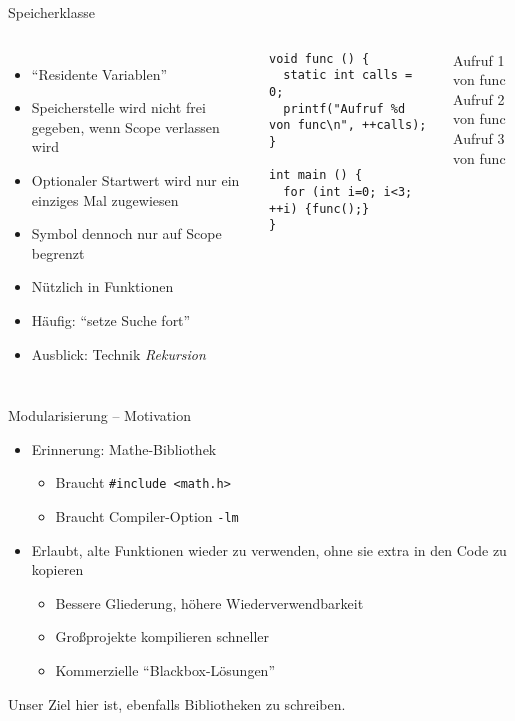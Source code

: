 \begin{frame}[fragile]{Speicherklasse }
%
\begin{columns}[T]
\begin{itemize}
\item \enquote{Residente Variablen}
\item Speicherstelle wird nicht frei gegeben, wenn Scope verlassen wird
\item Optionaler Startwert wird nur ein einziges Mal zugewiesen
\item Symbol dennoch nur auf Scope begrenzt
\item Nützlich in Funktionen
\item Häufig: \enquote{setze Suche fort}
\item Ausblick: Technik \emph{Rekursion}
\end{itemize}
%
\vspace{-10pt}
\begin{codebox}
\begin{verbatim}
void func () {
  static int calls = 0;
  printf("Aufruf %d von func\n", ++calls);
}

int main () {
  for (int i=0; i<3; ++i) {func();}
}
\end{verbatim}
\end{codebox}
%
\begin{cmdbox}[Ausgabe]
\scriptsize
Aufruf 1 von func\\
Aufruf 2 von func\\
Aufruf 3 von func
\end{cmdbox}
\end{columns}
%
\end{frame}


\begin{frame}[fragile]{Modularisierung -- Motivation}
%
\begin{itemize}
\item Erinnerung: Mathe-Bibliothek
	\begin{itemize}
	\item Braucht \texttt{#include <math.h>}
	\item Braucht Compiler-Option \texttt{-lm}
	\end{itemize}
\item Erlaubt, alte Funktionen wieder zu verwenden, ohne sie extra in den Code zu kopieren
	\begin{itemize}
	\item Bessere Gliederung, höhere Wiederverwendbarkeit
	\item Großprojekte kompilieren schneller
	\item Kommerzielle \enquote{Blackbox-Lösungen}
	\end{itemize}
\end{itemize}

\vspace{10pt}
Unser Ziel hier ist, ebenfalls Bibliotheken zu schreiben.
%
\end{frame}

